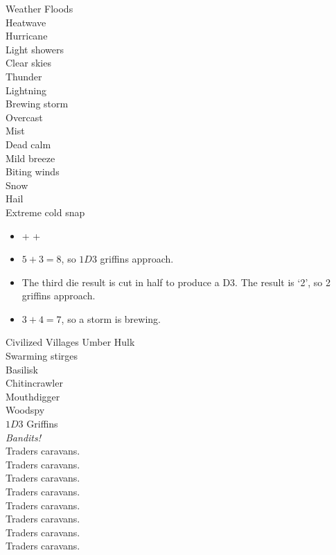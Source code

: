 \begin{multicols}{2}
\begin{encChart}{Weather}
  \encLine Floods \\
  \encLine Heatwave \\
  \encLine Hurricane \\
  \encLine Light showers \\
  \encLine Clear skies \\
  \encLine Thunder \\
  \encLine Lightning \\
  \encLine Brewing storm \\
  \encLine Overcast \\
  \encLine Mist \\
  \encLine Dead calm \\
  \encLine Mild breeze \\
  \encLine Biting winds \\
  \encLine Snow \\
  \encLine Hail \\
  \encLine Extreme cold snap \\
\end{encChart}

\begin{itemize}
  \item
  {\Large{} +  + }
  \item
  $5 + 3 = 8$, so $1D3$ griffins approach.
  \item
  The third die result is cut in half to produce a D3.
  The result is `2', so 2 griffins approach.
  \item
  $3 + 4 = 7$, so a storm is brewing.
\end{itemize}

\clearpage

\begin{encChart}{Civilized Villages}
  \encLine Umber Hulk \\
  \encLine Swarming stirges \\
  \encLine Basilisk \\
  \encLine Chitincrawler \\
  \encLine Mouthdigger \\
  \encLine Woodspy \\
  \encLine $1D3$ Griffins \\
  \hline
  \encLine \textit{Bandits!} \\
  \hline
  \encLine {} Traders caravans. \\
  \encLine {} Traders caravans. \\
  \encLine {} Traders caravans. \\
  \encLine {} Traders caravans. \\
  \encLine {} Traders caravans. \\
  \encLine {} Traders caravans. \\
  \encLine {} Traders caravans. \\
  \encLine {} Traders caravans. \\
\end{encChart}


\end{multicols}
